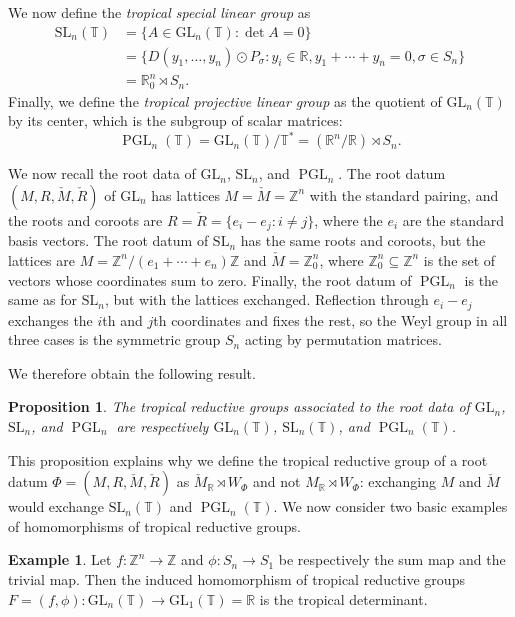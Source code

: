 \documentclass[10pt, a4paper]{amsart}
\newtheorem{proposition}[theorem]{Proposition}
\theoremstyle{definition}
\newtheorem{example}[theorem]{Example}
\theoremstyle{myitemstyle}
\newcommand{\ZZ}{\mathbb{Z}}
\newcommand{\RR}{\mathbb{R}}
\newcommand{\TT}{\mathbb{T}}
\newcommand{\Mcheck}{{\check{M}}}
\newcommand{\Rcheck}{\check{R}}
\DeclareMathOperator{\PGL}{PGL}
\newcommand{\SL}{{\mathrm{SL}}}
\newcommand{\GL}{{\mathrm{GL}}}
\begin{document}
We now define the \emph{tropical special linear group} as
\[\begin{split}
\SL_n(\TT)&=\{A\in \GL_n(\TT): \det A=0\}\\
&=\{D(y_1,\ldots,y_n)\odot P_{\sigma}:y_i\in \RR,y_1+\cdots+y_n=0,\sigma\in S_n\}\\ &=\RR^n_0\rtimes S_n.
\end{split}\]
Finally, we define the \emph{tropical projective linear group} as the quotient of $\GL_n(\TT)$ by its center, which is the subgroup of scalar matrices:
\[
\PGL_n(\TT)=\GL_n(\TT)/\TT^*=(\RR^n/\RR)\rtimes S_n. 
\]

We now recall the root data of $\GL_n$, $\SL_n$, and $\PGL_n$. 
The root datum $(M,R,\Mcheck,\Rcheck)$ of $\GL_n$ has lattices $M=\Mcheck=\ZZ^n$ with the standard pairing, and the roots and coroots are $R=\Rcheck=\{e_i-e_j:i\neq j\}$, where the $e_i$ are the standard basis vectors. The root datum of $\SL_n$ has the same roots and coroots, but the lattices are $M=\ZZ^n/(e_1+\cdots+e_n)\ZZ$ and $\Mcheck=\ZZ^n_0$, where $\ZZ^n_0\subseteq \ZZ^n$ is the set of vectors whose coordinates sum to zero. Finally, the root datum of $\PGL_n$ is the same as for $\SL_n$, but with the lattices exchanged. Reflection through $e_i-e_j$ exchanges the $i$th and $j$th coordinates and fixes the rest, so the Weyl group in all three cases is the symmetric group $S_n$ acting by permutation matrices. 

We therefore obtain the following result.

\begin{proposition} The tropical reductive groups associated to the root data of $\GL_n$, $\SL_n$, and $\PGL_n$ are respectively $\GL_n(\TT)$, $\SL_n(\TT)$, and $\PGL_n(\TT)$.
\label{prop:GLSLPGL}
\end{proposition}

This proposition explains why we define the tropical reductive group of a root datum $\Phi=(M,R,\Mcheck,\Rcheck)$ as $\Mcheck_{\RR}\rtimes W_{\Phi}$ and not $M_{\RR}\rtimes W_{\Phi}$: exchanging $M$ and $\Mcheck$ would exchange $\SL_n(\TT)$ and $\PGL_n(\TT)$. We now consider two basic examples of homomorphisms of tropical reductive groups. 

\begin{example} Let $f:\ZZ^n\to \ZZ$ and $\phi:S_n\to S_1$ be respectively the sum map and the trivial map. Then the induced homomorphism of tropical reductive groups $F=(f,\phi):\GL_n(\TT)\to \GL_1(\TT)=\RR$ is the tropical determinant.
\end{example}
\end{document}
